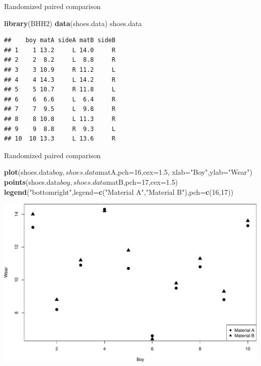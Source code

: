 \documentclass[9pt,ignorenonframetext,]{beamer}
\newenvironment{Shaded}{\begin{snugshade}}{\end{snugshade}}
\newcommand{\KeywordTok}[1]{\textcolor[rgb]{0.13,0.29,0.53}{\textbf{{#1}}}}
\newcommand{\DataTypeTok}[1]{\textcolor[rgb]{0.13,0.29,0.53}{{#1}}}
\newcommand{\DecValTok}[1]{\textcolor[rgb]{0.00,0.00,0.81}{{#1}}}
\newcommand{\FloatTok}[1]{\textcolor[rgb]{0.00,0.00,0.81}{{#1}}}
\newcommand{\StringTok}[1]{\textcolor[rgb]{0.31,0.60,0.02}{{#1}}}
\newcommand{\NormalTok}[1]{{#1}}
\begin{document}
\begin{frame}[fragile]{Randomized paired comparison}

\begin{Shaded}
\begin{Highlighting}[]
\KeywordTok{library}\NormalTok{(BHH2)}
\KeywordTok{data}\NormalTok{(shoes.data)}
\NormalTok{shoes.data}
\end{Highlighting}
\end{Shaded}

\begin{verbatim}
##    boy matA sideA matB sideB
## 1    1 13.2     L 14.0     R
## 2    2  8.2     L  8.8     R
## 3    3 10.9     R 11.2     L
## 4    4 14.3     L 14.2     R
## 5    5 10.7     R 11.8     L
## 6    6  6.6     L  6.4     R
## 7    7  9.5     L  9.8     R
## 8    8 10.8     L 11.3     R
## 9    9  8.8     R  9.3     L
## 10  10 13.3     L 13.6     R
\end{verbatim}

\end{frame}

\begin{frame}[fragile]{Randomized paired comparison}

\begin{Shaded}
\begin{Highlighting}[]
\KeywordTok{plot}\NormalTok{(shoes.data$boy,shoes.data$matA,}\DataTypeTok{pch=}\DecValTok{16}\NormalTok{,}\DataTypeTok{cex=}\FloatTok{1.5}\NormalTok{,}
     \DataTypeTok{xlab=}\StringTok{"Boy"}\NormalTok{,}\DataTypeTok{ylab=}\StringTok{"Wear"}\NormalTok{)}
\KeywordTok{points}\NormalTok{(shoes.data$boy,shoes.data$matB,}\DataTypeTok{pch=}\DecValTok{17}\NormalTok{,}\DataTypeTok{cex=}\FloatTok{1.5}\NormalTok{)}
\KeywordTok{legend}\NormalTok{(}\StringTok{"bottomright"}\NormalTok{,}\DataTypeTok{legend=}\KeywordTok{c}\NormalTok{(}\StringTok{"Material A"}\NormalTok{,}\StringTok{"Material B"}\NormalTok{),}\DataTypeTok{pch=}\KeywordTok{c}\NormalTok{(}\DecValTok{16}\NormalTok{,}\DecValTok{17}\NormalTok{))}
\end{Highlighting}
\end{Shaded}

\includegraphics{class4slides-jan18_files/figure-beamer/unnamed-chunk-19-1.pdf}

\end{frame}
\end{document}
